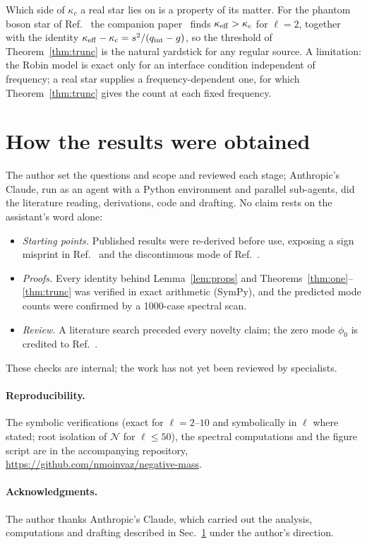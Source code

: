 \documentclass[11pt]{article}
\theoremstyle{remark}
\begin{document}
Which side of $\kappa_c$ a real star lies on is a property of its matter. For the phantom boson star of
Ref.~\cite{Shirokov2026} the companion paper~\cite{Moinvaziri2026b} finds $\kappa_{\rm eff}>\kappa_c$ for $\ell=2$, together
with the identity $\kappa_{\rm eff}-\kappa_c=s^2/(q_{\rm int}-g)$, so the threshold of Theorem~\ref{thm:trunc} is the
natural yardstick for any regular source. A limitation: the Robin model is exact only for an interface condition
independent of frequency; a real star supplies a frequency-dependent one, for which Theorem~\ref{thm:trunc} gives the
count at each fixed frequency.

\section{How the results were obtained}\label{sec:method}

The author set the questions and scope and reviewed each stage; Anthropic's Claude, run as an agent with a Python
environment and parallel sub-agents, did the literature reading, derivations, code and drafting. No claim rests on
the assistant's word alone:
\begin{itemize}
\item \emph{Starting points.} Published results were re-derived before use, exposing a sign misprint in
Ref.~\cite{DG2009} and the discontinuous mode of Ref.~\cite{GHI2005}.
\item \emph{Proofs.} Every identity behind Lemma~\ref{lem:props} and Theorems~\ref{thm:one}--\ref{thm:trunc} was verified
in exact arithmetic (SymPy), and the predicted mode counts were confirmed by a 1000-case spectral scan.
\item \emph{Review.} A literature search preceded every novelty claim; the zero mode $\phi_0$ is credited to
Ref.~\cite{DG2009}.
\end{itemize}
These checks are internal; the work has not yet been reviewed by specialists.

\paragraph{Reproducibility.} The symbolic verifications (exact for $\ell=2$--$10$ and symbolically in $\ell$ where
stated; root isolation of $\mathcal N$ for $\ell\le50$), the spectral computations and the figure script are in the
accompanying repository, \url{https://github.com/nmoinvaz/negative-mass}.

\paragraph{Acknowledgments.} The author thanks Anthropic's Claude, which carried out the analysis, computations and
drafting described in Sec.~\ref{sec:method} under the author's direction.
\end{document}
